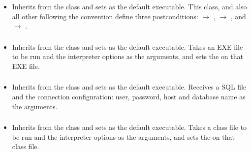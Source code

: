 \begin{itemize}[label={}]
    \item Inherits from the \hyperref[subsec:Run]{} class and sets  as the default
          executable.
          This class, and also all other following the  convention define three postconditions:
          \hyperref[subsec:UsedTimePostcondition]{} $\rightarrow$ ,
          \hyperref[subsec:UsedMemoryPostcondition]{} $\rightarrow$ , and
          \hyperref[subsec:ExitCodePostcondition]{} $\rightarrow$ .
\end{itemize}

\subsubsection*{}\label{subsec:RunCSharp}

\begin{itemize}[label={}]
    \item Inherits from the \hyperref[subsec:Run]{} class and sets  as the default
          executable.
          Takes an EXE file to be run and the interpreter options as the arguments, and sets the
          \hyperref[subsec:FileExistsPrerequisite]{} on that EXE file.
\end{itemize}

\subsubsection*{}\label{subsec:RunPSQL}

\begin{itemize}[label={}]
    \item Inherits from the \hyperref[subsec:Run]{} class and sets  as the default
          executable.
          Receives a SQL file and the connection configuration: user, password, host and database name as the
          arguments.
\end{itemize}

\subsubsection*{}\label{subsec:RunJavaClass}

\begin{itemize}[label={}]
    \item Inherits from the \hyperref[subsec:Run]{} class and sets  as the default
          executable.
          Takes a class file to be run and the interpreter options as the arguments, and sets the
          \hyperref[subsec:FileExistsPrerequisite]{} on that class file.
\end{itemize}

